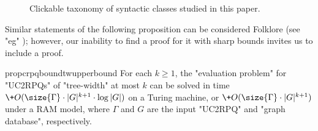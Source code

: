 \begin{figure}
	\centering
	\caption{
		\AP\label{fig:taonomy-syntactic}
		Clickable taxonomy of syntactic classes studied in this paper.
	}
\end{figure}


Similar statements of the following proposition can be considered Folklore (see "eg" {\cite[Theorem IV.3]{DBLP:conf/lics/0001BV17}}); however, our inability to find a proof for it with sharp bounds invites us to include a proof.
\begin{restatable}{prop}{crpqboundtwupperbound}
	\AP\label{prop:crpq-bound-tree-width-upper-bound}
    For each $k \geq 1$, the "evaluation problem" for "UC2RPQs" of "tree-width" at
    most $k$ can be solved in time $\+O(\size{\Gamma} \cdot |G|^{k+1} \cdot \log{|G|})$ on a Turing machine,
	or $\+O(\size{\Gamma} \cdot |G|^{k+1})$ under a RAM model, where $\Gamma$ and $G$ are the input "UC2RPQ" and "graph database", respectively.
\end{restatable}



